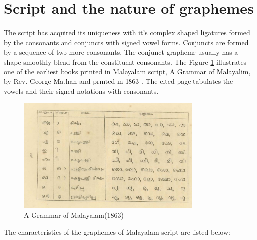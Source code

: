 \documentclass[10pt]{article}
\begin{document}
\section{Script and the nature of graphemes}

\paragraph{}
The script has acquired its uniqueness with it's complex shaped ligatures formed by the consonants and conjuncts with signed vowel forms. Conjuncts are formed by a sequence of two more consonants. The conjunct grapheme usually has a shape smoothly blend from the constituent consonants. The Figure \ref{mathan} illustrates one of the earliest books printed in Malayalam script, A Grammar of Malayalim, by Rev. George Mathan and printed in 1863 \cite{georgemathan}. The cited page tabulates the vowels and their signed notations with consonants. 

\begin{figure}[h!]
	\centering
	\includegraphics[width=0.8\textwidth]{images/mathanSymbols.png}
	\caption{A Grammar of Malayalam(1863)}
	\label{mathan}
\end{figure} 

The characteristics of the graphemes of Malayalam script are listed below:
\end{document}

